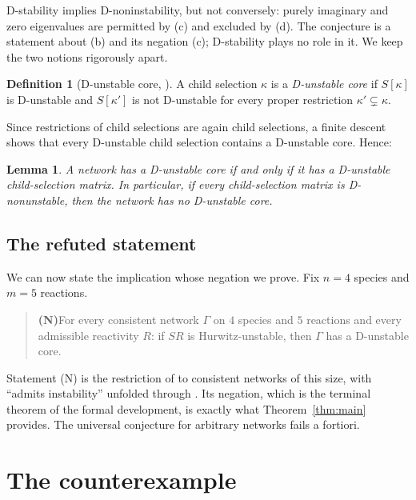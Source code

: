 \documentclass[11pt,a4paper]{article}
\newtheorem{lemma}[theorem]{Lemma}
\theoremstyle{definition}
\newtheorem{definition}[theorem]{Definition}
\theoremstyle{remark}
\begin{document}
D-stability implies D-noninstability, but not conversely: purely imaginary and zero eigenvalues are permitted by (c) and excluded by (d). The conjecture is a statement about (b) and its negation (c); D-stability plays no role in it. We keep the two notions rigorously apart.

\begin{definition}[D-unstable core, {\cite[Def.~16]{VassenaStadler2024}}]\label{def:core}
A child selection $\kappa$ is a \emph{D-unstable core} if $S[\kappa]$ is D-unstable and $S[\kappa']$ is not D-unstable for every proper restriction $\kappa'\subsetneq\kappa$.
\end{definition}

Since restrictions of child selections are again child selections, a finite descent shows that every D-unstable child selection contains a D-unstable core. Hence:

\begin{lemma}\label{lem:core-iff-child}
A network has a D-unstable core if and only if it has a D-unstable child-selection matrix. In particular, if every child-selection matrix is D-nonunstable, then the network has no D-unstable core.
\end{lemma}

\subsection{The refuted statement}

We can now state the implication whose negation we prove. Fix $n=4$ species and $m=5$ reactions.

\begin{quote}
\textbf{(N)}\quad For every consistent network $\Gamma$ on $4$ species and $5$ reactions and every admissible reactivity $R$: if $SR$ is Hurwitz-unstable, then $\Gamma$ has a D-unstable core.
\end{quote}

Statement (N) is the restriction of \cite[Conj.~17]{VassenaStadler2024} to consistent networks of this size, with ``admits instability'' unfolded through \cite[Obs.~4]{VassenaStadler2024}. Its negation, which is the terminal theorem of the formal development, is exactly what Theorem~\ref{thm:main} provides. The universal conjecture for arbitrary networks fails a fortiori.

\section{The counterexample}\label{sec:example}
\end{document}
